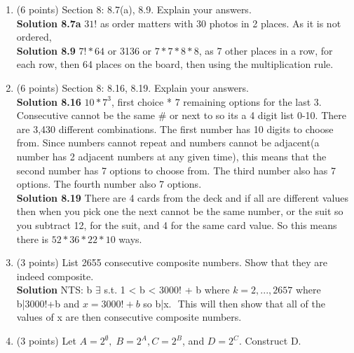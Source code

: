 \documentclass[12pt]{article}
\begin{document}
\begin{enumerate}
    \item (6 points) Section 8:  8.7(a), 8.9.  Explain your answers. \\ 
    \textbf{Solution 8.7a} $31!$ as order matters with 30 photos in 2 places. As it is not ordered,  \\
    
    \textbf{Solution 8.9} $7!*64$ or 3136 or $7*7*8*8$, as 7 other places in a row, for each row, then 64 places on the board, then using the multiplication rule. \\
    
    
    \item (6 points) Section 8:   8.16, 8.19.  Explain your answers. \\ 
    \textbf{Solution 8.16}  $10*7^3$, first choice * 7 remaining options for the last 3. Consecutive cannot be the same # or next to so its a 4 digit list 0-10. There are 3,430 diﬀerent combinations. The ﬁrst number has 10 digits to choose from. Since numbers cannot repeat and numbers cannot be adjacent(a number has 2 adjacent numbers at any given time), this means that the second number has 7 options to choose from. The third number also has 7 options. The fourth number also 7 options. \\
    
    
    \textbf{Solution 8.19} There are 4 cards from the deck and if all are different values then when you pick one the next cannot be the same number, or the suit so you subtract 12, for the suit, and 4 for the same card value. So this means there is $52*36*22*10$ ways. 
    
    
    
    \item (3 points) List 2655 consecutive composite numbers.  Show that they are indeed composite.  \\
    
    \textbf{Solution} NTS: b $\exists$  s.t.  1 < b < 3000! + b  where  $ k = 2, ..., 2657 $ where  b|3000!+b and $x = 3000!+b $ so b|x. $ $ This will then show that all of the values of x are then consecutive composite numbers. \\
    
    
    
    
    \item (3 points) Let $A = 2^{\emptyset}, \; B = 2^{A}, C = 2^{B}$, and $D = 2^{C}$.  Construct D.   
    
    
    

\end{enumerate}
\end{document}
